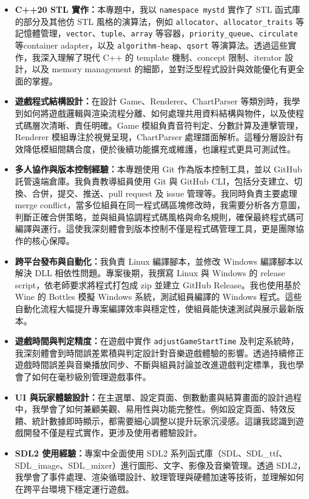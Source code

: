 \documentclass[a4paper,12pt]{article}
\begin{document}
\begin{itemize}
\item \textbf{C++20 STL 實作：}本專題中，我以 \verb|namespace mystd| 實作了 STL 函式庫的部分及其他仿 STL 風格的演算法，例如 \verb|allocator|、\verb|allocator_traits| 等記憶體管理，\verb|vector|、\verb|tuple|、\verb|array| 等容器，\verb|priority_queue|、\verb|circulate| 等container adapter，以及 \verb|algorithm-heap|、\verb|qsort| 等演算法。透過這些實作，我深入理解了現代 C++ 的 template 機制、concept 限制、iterator 設計，以及 memory management 的細節，並對泛型程式設計與效能優化有更全面的掌握。
\item \textbf{遊戲程式結構設計：}在設計 Game、Renderer、ChartParser 等類別時，我學到如何將遊戲邏輯與渲染流程分離、如何處理共用資料結構與物件，以及使程式碼層次清晰、責任明確。Game 模組負責音符判定、分數計算及連擊管理，Renderer 模組專注於視覺呈現，ChartParser 處理譜面解析。這種分層設計有效降低模組間耦合度，便於後續功能擴充或維護，也讓程式更具可測試性。
\item \textbf{多人協作與版本控制經驗：}本專題使用 Git 作為版本控制工具，並以 GitHub 託管遠端倉庫。我負責教導組員使用 Git 與 GitHub CLI，包括分支建立、切換、合併，提交、推送、pull request 及 issue 管理等。我同時負責主要處理 merge conflict，當多位組員在同一程式碼區塊修改時，我需要分析各方意圖，判斷正確合併策略，並與組員協調程式碼風格與命名規則，確保最終程式碼可編譯與運行。這使我深刻體會到版本控制不僅是程式碼管理工具，更是團隊協作的核心保障。
\item \textbf{跨平台發布與自動化：}我負責 Linux 編譯腳本，並修改 Windows 編譯腳本以解決 DLL 相依性問題。專案後期，我撰寫 Linux 與 Windows 的 release script，依老師要求將程式打包成 zip 並建立 GitHub Release。我也使用基於 Wine 的 Bottles 模擬 Windows 系統，測試組員編譯的 Windows 程式。這些自動化流程大幅提升專案編譯效率與穩定性，使組員能快速測試與展示最新版本。
\item \textbf{遊戲時間與判定精度：}在遊戲中實作 \verb|adjustGameStartTime| 及判定系統時，我深刻體會到時間誤差累積與判定設計對音樂遊戲體驗的影響。透過持續修正遊戲時間誤差與音樂播放同步、不斷與組員討論並改進遊戲判定標準，我也學會了如何在毫秒級別管理遊戲事件。
\item \textbf{UI 與玩家體驗設計：}在主選單、設定頁面、倒數動畫與結算畫面的設計過程中，我學會了如何兼顧美觀、易用性與功能完整性。例如設定頁面、特效反饋、統計數據即時顯示，都需要細心調整以提升玩家沉浸感。這讓我認識到遊戲開發不僅是程式實作，更涉及使用者體驗設計。
\item \textbf{SDL2 使用經驗：}專案中全面使用 SDL2 系列函式庫（SDL、SDL\_ttf、SDL\_image、SDL\_mixer）進行圖形、文字、影像及音樂管理。透過 SDL2，我學會了事件處理、渲染循環設計、紋理管理與硬體加速等技術，並理解如何在跨平台環境下穩定運行遊戲。
\end{itemize}
\end{document}
